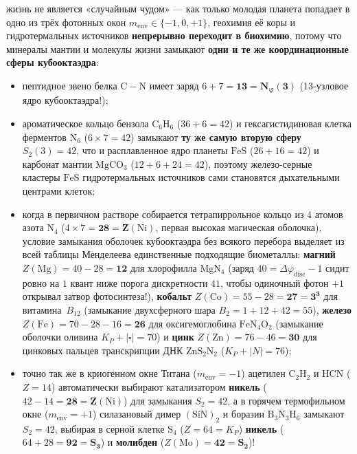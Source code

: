 \begin{enumerate}[label=\textbf{\arabic*.},noitemsep]
  жизнь не является «случайным чудом» --- как только молодая планета попадает в одно из трёх фотонных окон $m_{\mathrm{env}}\in\{-1,0,+1\}$, геохимия её коры и гидротермальных источников \textbf{непрерывно переходит в биохимию}, потому что минералы мантии и молекулы жизни замыкают \textbf{одни и те же координационные сферы кубооктаэдра}:
  \begin{itemize}[noitemsep]
  \item пептидное звено белка $\mathrm{C-N}$ имеет заряд $6 + 7 = \mathbf{13 = N_\varphi(3)}$ (13-узловое ядро кубооктаэдра!);
  \item ароматическое кольцо бензола $\mathrm{C_6H_6}$ ($36+6=42$) и гексагистидиновая клетка ферментов $\mathrm{N_6}$ ($6\times 7=42$) замыкают \textbf{ту же самую вторую сферу $S_2(3) = 42$}, что и расплавленное ядро планеты $\mathrm{FeS}$ ($26+16=42$) и карбонат мантии $\mathrm{MgCO_3}$ ($12+6+24=42$), поэтому железо-серные кластеры $\mathrm{FeS}$ гидротермальных источников сами становятся дыхательными центрами клеток;
  \item когда в первичном растворе собирается тетрапиррольное кольцо из 4 атомов азота $\mathrm{N_4}$ ($4\times 7 = \mathbf{28 = Z(\mathrm{Ni})}$, первая высокая магическая оболочка), условие замыкания оболочек кубооктаэдра без всякого перебора выделяет из всей таблицы Менделеева единственные подходящие биометаллы:
    \textbf{магний} $Z(\mathrm{Mg}) = 40 - 28 = \mathbf{12}$ для хлорофилла $\mathrm{MgN_4}$ (заряд $40 = \Delta\varphi_{\mathrm{disc}} - 1$ сидит ровно на $1$ квант ниже порога дискретности $41$, чтобы одиночный фотон $+1$ открывал затвор фотосинтеза!),
    \textbf{кобальт} $Z(\mathrm{Co}) = 55 - 28 = \mathbf{27 = 3^3}$ для витамина~$B_{12}$ (замыкание двухсферного шара $B_2 = 1+12+42 = 55$),
    \textbf{железо} $Z(\mathrm{Fe}) = 70 - 28 - 16 = \mathbf{26}$ для оксигемоглобина $\mathrm{FeN_4O_2}$ (замыкание оболочки оливина $K_P + |\square| = 70$) и
    \textbf{цинк} $Z(\mathrm{Zn}) = 76 - 46 = \mathbf{30}$ для цинковых пальцев транскрипции ДНК $\mathrm{ZnS_2N_2}$ ($K_P + |N| = 76$);
  \item точно так же в криогенном окне Титана ($m_{\mathrm{env}}=-1$) ацетилен $\mathrm{C_2H_2}$ и $\mathrm{HCN}$ ($Z=14$) автоматически выбирают катализатором \textbf{никель} ($42 - 14 = \mathbf{28 = Z(\mathrm{Ni})}$) для замыкания $S_2=42$, а в горячем термофильном окне ($m_{\mathrm{env}}=+1$) силазановый димер $(\mathrm{SiN})_2$ и боразин $\mathrm{B_3N_3H_6}$ замыкают $S_2 = 42$, выбирая в серной клетке $\mathrm{S_4}$ ($Z=64=K_P$) \textbf{никель} ($64+28 = \mathbf{92 = S_3}$) и \textbf{молибден} ($Z(\mathrm{Mo}) = \mathbf{42 = S_2}$)!
  \end{itemize}
\end{enumerate}

